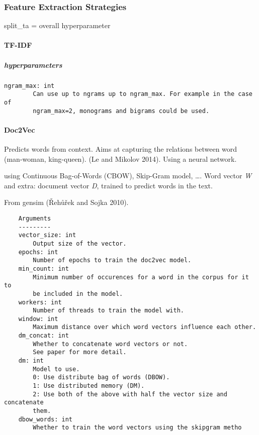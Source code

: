 \documentclass[
]{article}
\begin{document}
\hypertarget{feature-extraction-strategies}{%
\subsubsection{Feature Extraction
Strategies}\label{feature-extraction-strategies}}

split\_ta = overall hyperparameter

\hypertarget{tf-idf}{%
\paragraph{TF-IDF}\label{tf-idf}}

\hypertarget{hyperparameters-1}{%
\subparagraph{hyperparameters}\label{hyperparameters-1}}

\begin{verbatim}
ngram_max: int
        Can use up to ngrams up to ngram_max. For example in the case of
        ngram_max=2, monograms and bigrams could be used.
\end{verbatim}

\hypertarget{doc2vec}{%
\paragraph{Doc2Vec}\label{doc2vec}}

Predicts words from context. Aims at capturing the relations between
word (man-woman, king-queen). (Le and Mikolov 2014). Using a neural
network.

using Continuous Bag-of-Words (CBOW), Skip-Gram model, \ldots. Word
vector \emph{W} and extra: document vector \emph{D}, trained to predict
words in the text.

From gensim (Řehůřek and Sojka 2010).

\begin{verbatim}
    Arguments
    ---------
    vector_size: int
        Output size of the vector.
    epochs: int
        Number of epochs to train the doc2vec model.
    min_count: int
        Minimum number of occurences for a word in the corpus for it to
        be included in the model.
    workers: int
        Number of threads to train the model with.
    window: int
        Maximum distance over which word vectors influence each other.
    dm_concat: int
        Whether to concatenate word vectors or not.
        See paper for more detail.
    dm: int
        Model to use.
        0: Use distribute bag of words (DBOW).
        1: Use distributed memory (DM).
        2: Use both of the above with half the vector size and concatenate
        them.
    dbow_words: int
        Whether to train the word vectors using the skipgram metho
        
        
\end{verbatim}
\end{document}
